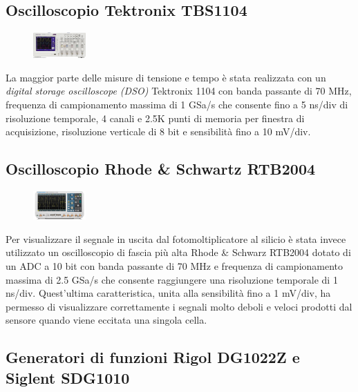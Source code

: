 \documentclass[journal]{IEEEtran}
\begin{document}
\subsection{\textbf{Oscilloscopio Tektronix TBS1104}}

\begin{figure}[h!]
  \centering
  \includegraphics[width=0.18\textwidth]{lab-reports/Schematics-and-graphics/TEK Osc.png}
\end{figure}

La maggior parte delle misure di tensione e tempo è stata realizzata con un \textit{digital storage oscilloscope (DSO)} Tektronix 1104 con banda passante di 70 MHz, frequenza di campionamento massima di 1 GSa/s che consente fino a 5 ns/div di risoluzione temporale, 4 canali e 2.5K punti di memoria per finestra di acquisizione, risoluzione verticale di 8 bit e sensibilità fino a 10 mV/div. \cite{A}

\subsection{\textbf{Oscilloscopio Rhode \& Schwartz RTB2004}}

\begin{figure}[h!]
  \centering
  \includegraphics[width=0.18\textwidth]{lab-reports/Schematics-and-graphics/RS Osc.png}
\end{figure}

Per visualizzare il segnale in uscita dal fotomoltiplicatore al silicio è stata invece utilizzato un oscilloscopio di fascia più alta Rhode & Schwarz RTB2004 dotato di un ADC a 10 bit con banda passante di 70 MHz e frequenza di campionamento massima di 2.5 GSa/s che consente raggiungere una risoluzione temporale di 1 ns/div. Quest'ultima caratteristica, unita alla sensibilità fino a 1 mV/div, ha permesso di visualizzare correttamente i segnali molto deboli e veloci prodotti dal sensore quando viene eccitata una singola cella. \cite{B}

\subsection{\textbf{Generatori di funzioni Rigol DG1022Z e Siglent SDG1010}}
\end{document}

